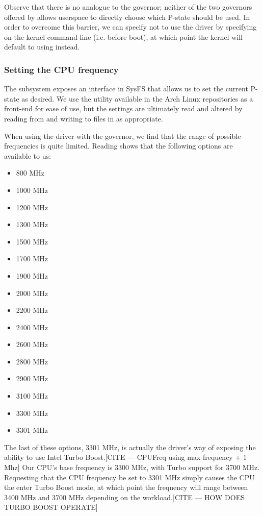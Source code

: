 Observe that there is no analogue to the  governor; neither of the
two governors offered by  allows userspace to directly choose
which P-state should be used. In order to overcome this barrier, we can specify
not to use the  driver by specifying  on
the kernel command line (i.e. before boot), at which point the kernel will
default to using  instead.

\subsubsection{Setting the CPU frequency}

The  subsystem exposes an interface in SysFS that allows us to set the
current P-state as desired. We use the  utility available in the Arch
Linux repositories as a front-end for ease of use, but the settings are
ultimately read and altered by reading from and writing to files in  as
appropriate.

When using the  driver with the  governor, we find that
the range of possible frequencies is quite limited. Reading  shows
that the following options are available to us:
\begin{itemize}
    \item 800 MHz
    \item 1000 MHz
    \item 1200 MHz
    \item 1300 MHz
    \item 1500 MHz
    \item 1700 MHz
    \item 1900 MHz
    \item 2000 MHz
    \item 2200 MHz
    \item 2400 MHz
    \item 2600 MHz
    \item 2800 MHz
    \item 2900 MHz
    \item 3100 MHz
    \item 3300 MHz
    \item 3301 MHz
\end{itemize}

The last of these options, 3301 MHz, is actually the driver's way of exposing
the ability to use Intel Turbo Boost.[CITE — CPUFreq using max frequency + 1 Mhz]
Our CPU's base frequency is 3300 MHz,
with Turbo support for 3700 MHz. Requesting that the CPU frequency be set to
3301 MHz simply causes the CPU the enter Turbo Boost mode, at which point the
frequency will range between 3400 MHz and 3700 MHz depending on the
workload.[CITE — HOW DOES TURBO BOOST OPERATE]
